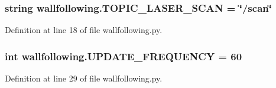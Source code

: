 \subsubsection[{\texorpdfstring{T\+O\+P\+I\+C\+\_\+\+L\+A\+S\+E\+R\+\_\+\+S\+C\+AN}{TOPIC_LASER_SCAN}}]{\setlength{\rightskip}{0pt plus 5cm}string wallfollowing.\+T\+O\+P\+I\+C\+\_\+\+L\+A\+S\+E\+R\+\_\+\+S\+C\+AN = \char`\"{}/scan\char`\"{}}\hypertarget{namespacewallfollowing_a7e38e617465ebdfa7ec0576ac63443f8}{}\label{namespacewallfollowing_a7e38e617465ebdfa7ec0576ac63443f8}


Definition at line 18 of file wallfollowing.\+py.

\subsubsection[{\texorpdfstring{U\+P\+D\+A\+T\+E\+\_\+\+F\+R\+E\+Q\+U\+E\+N\+CY}{UPDATE_FREQUENCY}}]{\setlength{\rightskip}{0pt plus 5cm}int wallfollowing.\+U\+P\+D\+A\+T\+E\+\_\+\+F\+R\+E\+Q\+U\+E\+N\+CY = 60}\hypertarget{namespacewallfollowing_a7ba7bea964894fd6f3def270bd3afa43}{}\label{namespacewallfollowing_a7ba7bea964894fd6f3def270bd3afa43}


Definition at line 29 of file wallfollowing.\+py.

